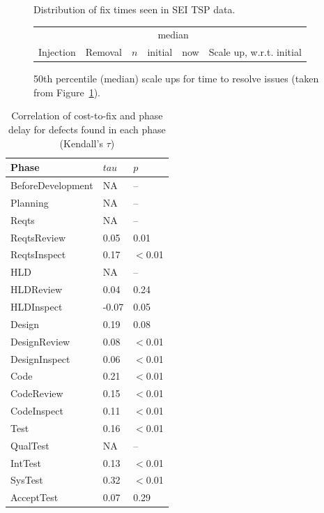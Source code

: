 \documentclass{sig-alternate}
\newcommand{\fig}[1]{Figure~\ref{fig:#1}}
\def\baselinestretch{1}
\begin{document}
\begin{figure}[!t]
\begin{center}
\begin{tabular}{r|rrr|ll|rl}
 \end{tabular}
\end{center}
\caption{Distribution of fix times seen in SEI TSP data.}
\label{fig:raw}
\end{figure}





 
 \begin{figure}[!t]
\renewcommand{\baselinestretch}{0.7}
\scriptsize
\begin{center}
\begin{tabular}{l@{~~}|l@{~}|r@{~}|r@{~}r@{~}|r@{~}l}
           \multicolumn{2}{c}{~}                 &  &\multicolumn{2}{c|}{median}\\
  Injection&   Removal& $n$ & initial & now & \multicolumn{2}{l}{Scale up, w.r.t. initial}

\end{tabular}
\end{center}
\caption{50th percentile (median) scale ups  for  time to resolve issues (taken from \fig{raw}).}
\label{fig:scale}
\end{figure}
 



 
\begin{table}[ht]
\centering
\begin{tabular}{lll}
  Phase & $tau$ & $p$ \\ 
  \hline
BeforeDevelopment & NA & -- \\ 
  Planning & NA & -- \\ 
  Reqts & NA & -- \\ 
  ReqtsReview & 0.05 & 0.01 \\ 
  ReqtsInspect & 0.17 & $<$0.01 \\ 
  HLD & NA & -- \\ 
  HLDReview & 0.04 & 0.24 \\ 
  HLDInspect & -0.07 & 0.05 \\ 
  Design & 0.19 & 0.08 \\ 
  DesignReview & 0.08 & $<$0.01 \\ 
  DesignInspect & 0.06 & $<$0.01 \\ 
  Code & 0.21 & $<$0.01 \\ 
  CodeReview & 0.15 & $<$0.01 \\ 
  CodeInspect & 0.11 & $<$0.01 \\ 
  Test & 0.16 & $<$0.01 \\ 
  QualTest & NA & -- \\ 
  IntTest & 0.13 & $<$0.01 \\ 
  SysTest & 0.32 & $<$0.01 \\ 
  AcceptTest & 0.07 & 0.29 \\ 
  \end{tabular}
\caption{Correlation of cost-to-fix and phase delay for defects found in each phase (Kendall's $\tau$)} 
\label{tab:phase_corr}
\end{table}
\end{document}
